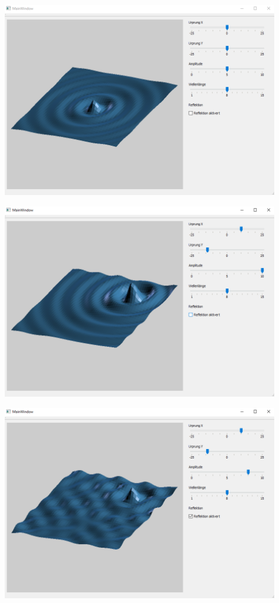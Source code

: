 \documentclass[12pt,a4paper]{scrartcl}
\begin{document}
\begin{center}
	\includegraphics[width=0.9\textwidth]{Images/FinalProduct/FinalProduct0.png}
\end{center}
\begin{center}
	\includegraphics[width=0.9\textwidth]{Images/FinalProduct/FinalProduct234.png}
\end{center}
\begin{center}
	\includegraphics[width=0.9\textwidth]{Images/FinalProduct/FinalProduct306.png}
\end{center}
\end{document}
